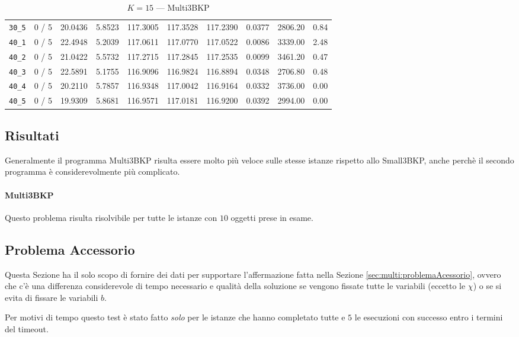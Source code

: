 \begin{table}[h!]
\begin{center}
\begin{tabular}{| c | c | c | c | c | c | c | c | c | c |}
\verb|30_5| & 0 / 5 & 20.0436 & 5.8523 & 117.3005 & 117.3528 & 117.2390 & 0.0377 & 2806.20 & 0.84\\ 
\verb|40_1| & 0 / 5 & 22.4948 & 5.2039 & 117.0611 & 117.0770 & 117.0522 & 0.0086 & 3339.00 & 2.48\\ 
\verb|40_2| & 0 / 5 & 21.0422 & 5.5732 & 117.2715 & 117.2845 & 117.2535 & 0.0099 & 3461.20 & 0.47\\ 
\verb|40_3| & 0 / 5 & 22.5891 & 5.1755 & 116.9096 & 116.9824 & 116.8894 & 0.0348 & 2706.80 & 0.48\\ 
\verb|40_4| & 0 / 5 & 20.2110 & 5.7857 & 116.9348 & 117.0042 & 116.9164 & 0.0332 & 3736.00 & 0.00\\ 
\verb|40_5| & 0 / 5 & 19.9309 & 5.8681 & 116.9571 & 117.0181 & 116.9200 & 0.0392 & 2994.00 & 0.00\\ 
\hline
\end{tabular}
\caption{$K = 15$ --- Multi3BKP}
\label{table:multi:15}
\end{center}
\end{table}


\subsection{Risultati}
Generalmente il programma Multi3BKP risulta essere molto più veloce sulle 
stesse istanze rispetto allo Small3BKP, anche perchè il secondo programma 
è considerevolmente più complicato. 

\paragraph{Multi3BKP}
Questo problema risulta risolvibile per tutte le istanze con $10$ oggetti prese
in esame. 







\subsection{Problema Accessorio}
Questa Sezione ha il solo scopo di fornire dei dati per supportare l'affermazione
fatta nella Sezione \ref{sec:multi:problemaAcessorio}, ovvero che c'è una 
differenza  considerevole di tempo necessario e qualità della soluzione se 
vengono fissate 
tutte le variabili (eccetto le $\chi$) o se si evita di fissare le variabili
$b$.

Per motivi di tempo questo test è stato fatto \emph{solo} per le istanze che
hanno completato tutte e $5$ le esecuzioni con successo entro i termini del
timeout.



